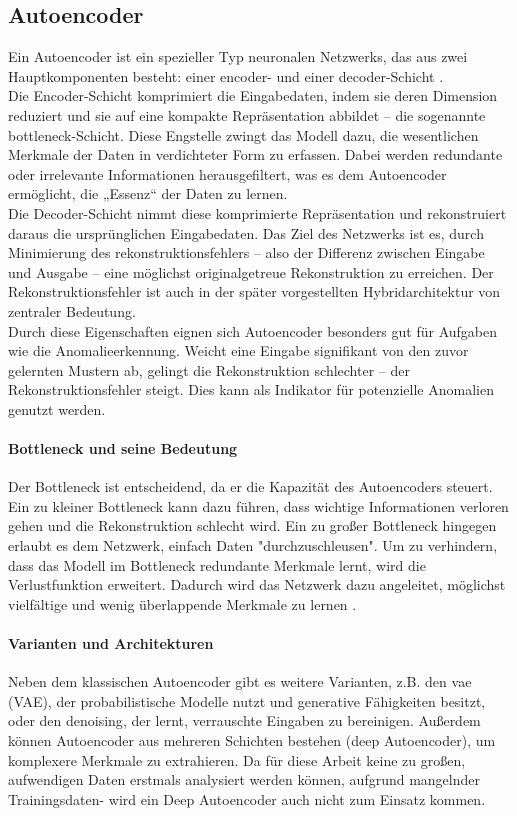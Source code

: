 \documentclass[a4paper,12pt]{article}
\begin{document}
	\subsection{Autoencoder}
	Ein Autoencoder ist ein spezieller Typ neuronalen Netzwerks, das aus zwei Hauptkomponenten besteht: einer \gls{encoder}- und einer \gls{decoder}-Schicht \cite[S.3]{michelucci2022introduction}.
	\\[0.5em]
	Die Encoder-Schicht komprimiert die Eingabedaten, indem sie deren Dimension reduziert und sie auf eine kompakte Repräsentation abbildet – die sogenannte \gls{bottleneck}-Schicht. Diese Engstelle zwingt das Modell dazu, die wesentlichen Merkmale der Daten in verdichteter Form zu erfassen. Dabei werden redundante oder irrelevante Informationen herausgefiltert, was es dem Autoencoder ermöglicht, die „Essenz“ der Daten zu lernen.
	\\[0.5em]
	Die Decoder-Schicht nimmt diese komprimierte Repräsentation und rekonstruiert daraus die ursprünglichen Eingabedaten. Das Ziel des Netzwerks ist es, durch Minimierung des \gls{rekonstruktionsfehler}s – also der Differenz zwischen Eingabe und Ausgabe – eine möglichst originalgetreue Rekonstruktion zu erreichen. Der Rekonstruktionsfehler ist auch in der später vorgestellten Hybridarchitektur von zentraler Bedeutung.
	\\[0.5em]
	Durch diese Eigenschaften eignen sich Autoencoder besonders gut für Aufgaben wie die Anomalieerkennung. Weicht eine Eingabe signifikant von den zuvor gelernten Mustern ab, gelingt die Rekonstruktion schlechter – der Rekonstruktionsfehler steigt. Dies kann als Indikator für potenzielle Anomalien genutzt werden.
	
	\paragraph{Bottleneck und seine Bedeutung}
	Der Bottleneck ist entscheidend, da er die Kapazität des Autoencoders steuert. Ein zu kleiner Bottleneck kann dazu führen, dass wichtige Informationen verloren gehen und die Rekonstruktion schlecht wird. Ein zu großer Bottleneck hingegen erlaubt es dem Netzwerk, einfach Daten "durchzuschleusen". Um zu verhindern, dass das Modell im Bottleneck redundante Merkmale lernt, wird die Verlustfunktion erweitert. Dadurch wird das Netzwerk dazu angeleitet, möglichst vielfältige und wenig überlappende Merkmale zu lernen \cite{laakom2022reducing}.
	
	\paragraph{Varianten und Architekturen}
	Neben dem klassischen Autoencoder gibt es weitere Varianten, z.B. den \gls{vae} (VAE), der probabilistische Modelle nutzt und generative Fähigkeiten besitzt, oder den \gls{denoising}, der lernt, verrauschte Eingaben zu bereinigen. Außerdem können Autoencoder aus mehreren Schichten bestehen (deep Autoencoder), um komplexere Merkmale zu extrahieren. Da für diese Arbeit keine zu großen, aufwendigen Daten erstmals analysiert werden können, aufgrund mangelnder Trainingsdaten- wird ein Deep Autoencoder auch nicht zum Einsatz kommen.
	
\end{document}

